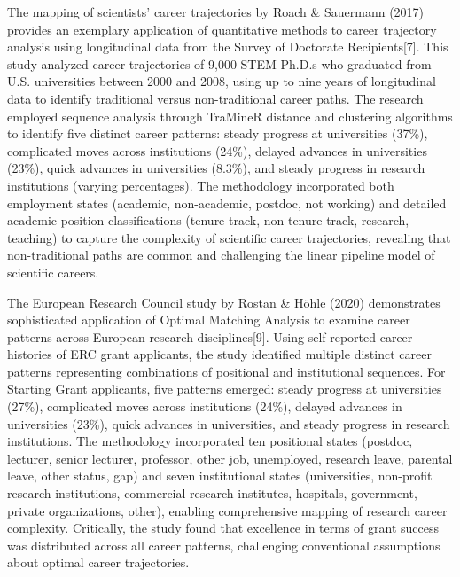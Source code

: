 \documentclass[main.tex]{subfiles}
\begin{document}
The mapping of scientists' career trajectories by Roach \& Sauermann (2017) provides an exemplary application of quantitative methods to career trajectory analysis using longitudinal data from the Survey of Doctorate Recipients[7]. This study analyzed career trajectories of 9,000 STEM Ph.D.s who graduated from U.S. universities between 2000 and 2008, using up to nine years of longitudinal data to identify traditional versus non-traditional career paths. The research employed sequence analysis through TraMineR distance and clustering algorithms to identify five distinct career patterns: steady progress at universities (37\%), complicated moves across institutions (24\%), delayed advances in universities (23\%), quick advances in universities (8.3\%), and steady progress in research institutions (varying percentages). The methodology incorporated both employment states (academic, non-academic, postdoc, not working) and detailed academic position classifications (tenure-track, non-tenure-track, research, teaching) to capture the complexity of scientific career trajectories, revealing that non-traditional paths are common and challenging the linear pipeline model of scientific careers.

The European Research Council study by Rostan \& Höhle (2020) demonstrates sophisticated application of Optimal Matching Analysis to examine career patterns across European research disciplines[9]. Using self-reported career histories of ERC grant applicants, the study identified multiple distinct career patterns representing combinations of positional and institutional sequences. For Starting Grant applicants, five patterns emerged: steady progress at universities (27\%), complicated moves across institutions (24\%), delayed advances in universities (23\%), quick advances in universities, and steady progress in research institutions. The methodology incorporated ten positional states (postdoc, lecturer, senior lecturer, professor, other job, unemployed, research leave, parental leave, other status, gap) and seven institutional states (universities, non-profit research institutions, commercial research institutes, hospitals, government, private organizations, other), enabling comprehensive mapping of research career complexity. Critically, the study found that excellence in terms of grant success was distributed across all career patterns, challenging conventional assumptions about optimal career trajectories.
\end{document}
